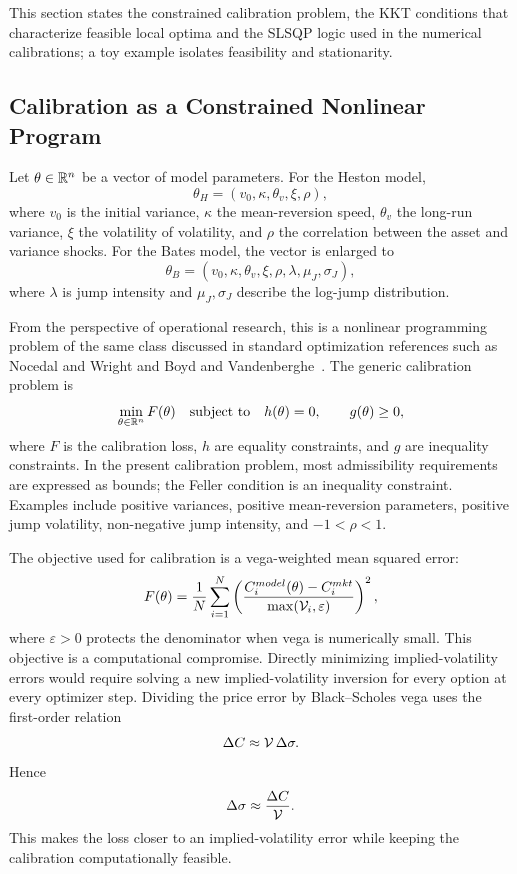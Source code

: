 This section states the constrained calibration problem, the KKT conditions that characterize feasible local optima and the SLSQP logic used in the numerical calibrations; a toy example isolates feasibility and stationarity.
\subsection{Calibration as a Constrained Nonlinear Program}

Let \(\theta\in\mathbb{R}^n\) be a vector of model parameters. For the Heston model,
\[
    \theta_H=(v_0,\kappa,\theta_v,\xi,\rho),
\]
where \(v_0\) is the initial variance, \(\kappa\) the mean-reversion speed, \(\theta_v\) the long-run variance, \(\xi\) the volatility of volatility, and \(\rho\) the correlation between the asset and variance shocks. For the Bates model, the vector is enlarged to
\[
    \theta_B=(v_0,\kappa,\theta_v,\xi,\rho,\lambda,\mu_J,\sigma_J),
\]
where \(\lambda\) is jump intensity and \(\mu_J,\sigma_J\) describe the log-jump distribution.

From the perspective of operational research, this is a nonlinear programming problem of the same class discussed in standard optimization references such as Nocedal and Wright and Boyd and Vandenberghe~\cite{NocedalWright2006,BoydVandenberghe2004}. The generic calibration problem is
\begin{equation}\label{eq:generic-nlp}
    \min_{\theta\in\mathbb{R}^n} F(\theta)
    \quad\text{subject to}\quad
    h(\theta)=0,\qquad g(\theta)\geq 0,
\end{equation}
where \(F\) is the calibration loss, \(h\) are equality constraints, and \(g\) are inequality constraints. In the present calibration problem, most admissibility requirements are expressed as bounds; the Feller condition is an inequality constraint. Examples include positive variances, positive mean-reversion parameters, positive jump volatility, non-negative jump intensity, and \(-1<\rho<1\).



The objective used for calibration is a vega-weighted mean squared error:
\begin{equation}\label{eq:vega-weighted-objective}
    F(\theta)
    =
    \frac{1}{N}\sum_{i=1}^N
    \left(
    \frac{C_i^{model}(\theta)-C_i^{mkt}}{\max(\mathcal{V}_i,\varepsilon)}
    \right)^2,
\end{equation}
where \(\varepsilon>0\) protects the denominator when vega is numerically small. This objective is a computational compromise. Directly minimizing implied-volatility errors would require solving a new implied-volatility inversion for every option at every optimizer step. Dividing the price error by Black--Scholes vega uses the first-order relation
\begin{equation}
    \Delta C \approx \mathcal{V} \, \Delta\sigma.
\end{equation}
Hence
\begin{equation}
    \Delta\sigma \approx \frac{\Delta C}{\mathcal{V}}.
\end{equation}
This makes the loss closer to an implied-volatility error while keeping the calibration computationally feasible.

